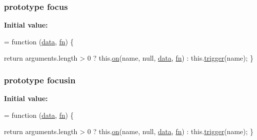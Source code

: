 \subsubsection[{\texorpdfstring{focus}{focus}}]{ {\bf prototype} focus}\hypertarget{jquery-2_82_81-vsdoc_8js_a2bab6fb1fd05f2802566c86887bdc7a2}{}\label{jquery-2_82_81-vsdoc_8js_a2bab6fb1fd05f2802566c86887bdc7a2}
{\bfseries Initial value\+:}
\begin{DoxyCode}
= \textcolor{keyword}{function} (\hyperlink{jquery-2_82_81-vsdoc_8js_a609407b3456fdc3c5671a9fc4a226ff7}{data}, \hyperlink{jquery-2_82_81-vsdoc_8js_acef6bdaf6b9b20fdcca1ea86f0902c3b}{fn}) \{
        

        \textcolor{keywordflow}{return} arguments.length > 0 ?
            this.\hyperlink{jquery-2_82_81-vsdoc_8js_ae453b412b883f60220d73468ef6c6dbc}{on}(name, null, \hyperlink{jquery-2_82_81-vsdoc_8js_a609407b3456fdc3c5671a9fc4a226ff7}{data}, \hyperlink{jquery-2_82_81-vsdoc_8js_acef6bdaf6b9b20fdcca1ea86f0902c3b}{fn}) :
            this.\hyperlink{jquery-2_82_81-vsdoc_8js_a2388c4114d5e3e4eab020f973641519c}{trigger}(name);
    \}
\end{DoxyCode}
\subsubsection[{\texorpdfstring{focusin}{focusin}}]{ {\bf prototype} focusin}\hypertarget{jquery-2_82_81-vsdoc_8js_a332119e7a3f7f91d04142c0b0ef4d719}{}\label{jquery-2_82_81-vsdoc_8js_a332119e7a3f7f91d04142c0b0ef4d719}
{\bfseries Initial value\+:}
\begin{DoxyCode}
= \textcolor{keyword}{function} (\hyperlink{jquery-2_82_81-vsdoc_8js_a609407b3456fdc3c5671a9fc4a226ff7}{data}, \hyperlink{jquery-2_82_81-vsdoc_8js_acef6bdaf6b9b20fdcca1ea86f0902c3b}{fn}) \{
        

        \textcolor{keywordflow}{return} arguments.length > 0 ?
            this.\hyperlink{jquery-2_82_81-vsdoc_8js_ae453b412b883f60220d73468ef6c6dbc}{on}(name, null, \hyperlink{jquery-2_82_81-vsdoc_8js_a609407b3456fdc3c5671a9fc4a226ff7}{data}, \hyperlink{jquery-2_82_81-vsdoc_8js_acef6bdaf6b9b20fdcca1ea86f0902c3b}{fn}) :
            this.\hyperlink{jquery-2_82_81-vsdoc_8js_a2388c4114d5e3e4eab020f973641519c}{trigger}(name);
    \}
\end{DoxyCode}
